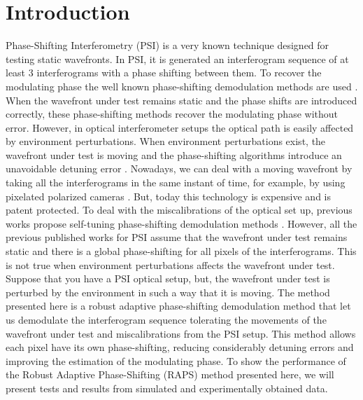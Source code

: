 \section{Introduction}
Phase-Shifting Interferometry (PSI) is a very known technique designed for
testing static wavefronts. In PSI, it is generated an interferogram sequence of
at least 3 interferograms with a phase shifting between them. To recover the
modulating phase the well known phase-shifting demodulation methods are used
\cite{Bruning:74,Morgan,Schwider:83,Cheng:85,Hariharan:87,Estrada:09}. When the
wavefront under test remains static and the phase
shifts are introduced correctly, these phase-shifting methods recover the
modulating phase without error. However, in optical interferometer setups the
optical path is easily affected by environment perturbations. When environment
perturbations exist, the wavefront under test is moving and the phase-shifting
algorithms introduce an unavoidable detuning error
\cite{Servin:09,GeneralTheory}. Nowadays, we can deal
with a moving wavefront by taking all the interferograms in the same instant of
time, for example, by using pixelated polarized cameras \cite{Servin:10,
Kimbrough:06}. But, today this technology is expensive and is patent protected.
To deal with the miscalibrations of the optical set up, previous works propose
self-tuning phase-shifting demodulation methods
\cite{Xu:06,Wang:04,Estrada:10}. However, all the previous
published works for PSI assume that the wavefront under test remains static and
there is a global phase-shifting for all pixels of the interferograms. This is
not true when environment perturbations affects the wavefront under test.
Suppose that you have a PSI optical setup, but, the wavefront under test is
perturbed by the environment in such a way that it is moving. The method
presented here is a robust adaptive phase-shifting demodulation method that let
us demodulate the interferogram sequence tolerating the movements of the
wavefront under test and miscalibrations from the PSI setup. This method allows
each pixel have its own phase-shifting, reducing considerably detuning errors
and improving the estimation of the modulating phase. To show the performance of
the Robust Adaptive Phase-Shifting (RAPS) method presented here, we will present
tests and results from simulated and experimentally obtained data.

